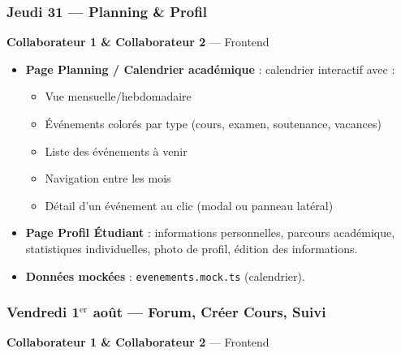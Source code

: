 \documentclass[a4paper,12pt,french]{article}
\begin{document}
\subsubsection{Jeudi 31 — Planning \& Profil}

\begin{assignmentbox}
\textbf{Collaborateur 1 \& Collaborateur 2} — Frontend
\end{assignmentbox}

\begin{itemize}
    \item \textbf{Page Planning / Calendrier académique} : calendrier interactif avec :
    \begin{itemize}
        \item Vue mensuelle/hebdomadaire
        \item Événements colorés par type (cours, examen, soutenance, vacances)
        \item Liste des événements à venir
        \item Navigation entre les mois
        \item Détail d'un événement au clic (modal ou panneau latéral)
    \end{itemize}
    \item \textbf{Page Profil Étudiant} : informations personnelles, parcours académique, statistiques individuelles, photo de profil, édition des informations.
    \item \textbf{Données mockées} : \texttt{evenements.mock.ts} (calendrier).
\end{itemize}

\subsubsection{Vendredi 1$^\text{er}$ août — Forum, Créer Cours, Suivi}

\begin{assignmentbox}
\textbf{Collaborateur 1 \& Collaborateur 2} — Frontend
\end{assignmentbox}
\end{document}
